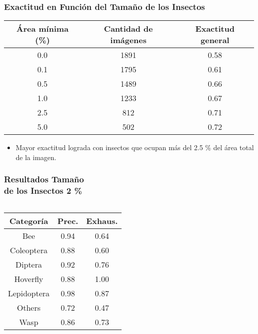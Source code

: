 \begin{frame}
    \frametitle{Exactitud en Función del Tamaño de los Insectos}
    \vspace*{-5mm}

    \begin{center}\small
    \begin{tabular}{ccc}
        \toprule
        \textbf{Área mínima (\%)} & \textbf{Cantidad de imágenes} & \textbf{Exactitud general}\\
        \midrule
        0.0 & 1891 & 0.58 \\
        0.1 & 1795 & 0.61 \\
        0.5 & 1489 & 0.66 \\
        1.0 & 1233 & 0.67 \\
        2.5 & 812 & 0.71 \\
        5.0 & 502 & 0.72 \\
        \bottomrule
    \end{tabular}
    \end{center}

    \begin{itemize}
        \item Mayor exactitud lograda con insectos que ocupan más del 2.5 \% del área total de la imagen.
    \end{itemize}
\end{frame}

\begin{frame}
    \frametitle{Resultados Tamaño\\ de los Insectos 2 \%}
    \vspace*{-0.5cm}
    \begin{columns}
    \begin{center}\small
    \begin{tabular}{@{}ccc@{}}
    \toprule
          \textbf{Categoría} & \textbf{Prec.}  &  \textbf{Exhaus.}\\ 
    \midrule
        Bee &  0.94 &  0.64 \\
        Coleoptera &  0.88 &  0.60 \\
        Diptera &  0.92 &  0.76 \\
        Hoverfly &  0.88 &  1.00 \\
        Lepidoptera &  0.98 &  0.87 \\
        Others &  0.72 &  0.47 \\
        Wasp &  0.86 &  0.73 \\
    \bottomrule
    \end{tabular}
    \end{center}
    \vspace*{-1cm}
    \begin{center}
    \end{center}
    \end{columns}
\end{frame}

